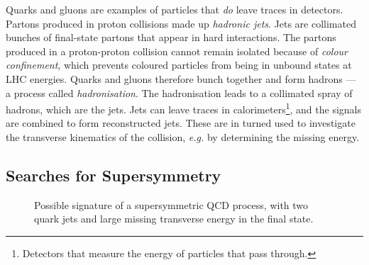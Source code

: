 \documentclass[twoside,english]{uiofysmaster}
\begin{document}
{Quarks and gluons are examples of particles that \textit{do} leave traces in detectors. Partons produced in proton collisions made up \textit{hadronic jets}. Jets are collimated bunches of final-state partons that appear in hard interactions. The partons produced in a proton-proton collision cannot remain isolated because of \textit{colour confinement}, which prevents coloured particles from being in unbound states at LHC energies. Quarks and gluons therefore bunch together and form hadrons --- a process called \textit{hadronisation}. The hadronisation leads to a collimated spray of hadrons, which are the jets. Jets can leave traces in calorimeters\footnote{Detectors that measure the energy of particles that pass through.}, and the signals are combined to form reconstructed jets. These are in turned used to investigate the transverse kinematics of the collision, \textit{e.g.} by determining the missing energy. 





\subsection{Searches for Supersymmetry}

\begin{figure}[H]
\centering
{}
\caption{Possible signature of a supersymmetric QCD process, with two quark jets and large missing transverse energy in the final state.}
\label{Fig:: susy hadron : decay at ATLAS}
\end{figure}


}
\end{document}
